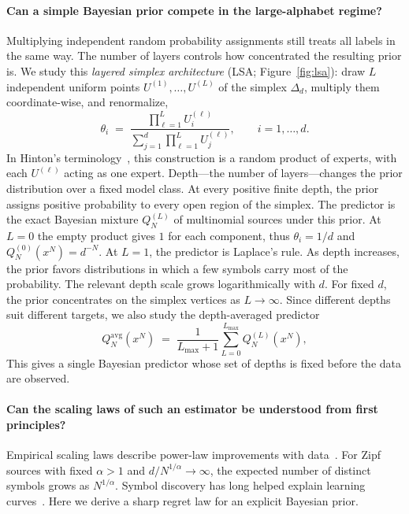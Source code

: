 \documentclass[anon]{alt2027}
\newcommand{\simplex}{\Delta_d}
\newcommand{\Lmax}{L_{\max}}
\begin{document}
\paragraph{Can a simple Bayesian prior compete in the large-alphabet regime?}
Multiplying independent random probability assignments still treats all labels in the same way. The number of layers controls how concentrated the resulting prior is. We study this \emph{layered simplex architecture} (LSA; Figure~\ref{fig:lsa}): draw $L$ independent uniform points $U^{(1)},\dots,U^{(L)}$ of the simplex $\simplex$, multiply them coordinate-wise, and renormalize,
\begin{equation}
\label{eq:lsa}
\theta_i \;=\; \frac{\prod_{\ell=1}^{L}U^{(\ell)}_i}{\sum_{j=1}^{d}\prod_{\ell=1}^{L}U^{(\ell)}_j},\qquad i=1,\dots,d.
\end{equation}
In Hinton's terminology~\citep{Hinton1999ProductsOE}, this construction is a random product of experts, with each $U^{(\ell)}$ acting as one expert. 
Depth---the number of layers---changes the prior distribution over a fixed model class. At every positive finite depth, the prior assigns positive probability to every open region of the simplex. The predictor is the exact Bayesian mixture $Q^{(L)}_N$ of multinomial sources under this prior. At $L=0$ the empty product gives $1$ for each component, thus  $\theta_i=1/d$ and $Q_N^{(0)}(x^N)=d^{-N}$. At $L=1$, the predictor is Laplace's rule. As depth increases, the prior favors distributions in which a few symbols carry most of the probability. The relevant depth scale grows logarithmically with $d$. For fixed $d$, the prior concentrates on the simplex vertices as $L\to\infty$. Since different depths suit different targets, we also study the depth-averaged predictor
\begin{equation}
\label{eq:avg}
Q^{\mathrm{avg}}_N(x^N)\;=\;\frac{1}{\Lmax+1}\sum_{L=0}^{\Lmax}Q^{(L)}_N(x^N),
\end{equation}
This gives a single Bayesian predictor whose set of depths is fixed before the data are observed. 

\paragraph{Can the scaling laws of such an estimator be understood from first principles?}
Empirical scaling laws describe power-law improvements with data~\citep{kaplan2020scaling}. For Zipf sources with fixed $\alpha>1$ and $d/N^{1/\alpha}\to\infty$, the expected number of distinct symbols grows as $N^{1/\alpha}$. Symbol discovery has long helped explain learning curves~\citep{hutter2021learning,michaud2023quantization,bahri2024explaining,debowski2025zipf}. Here we derive a sharp regret law for an explicit Bayesian prior.
\end{document}
